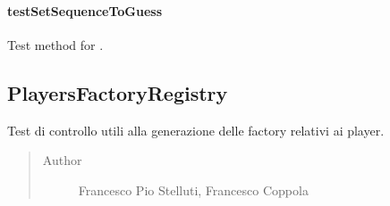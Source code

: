 \documentclass[letterpaper,10pt,italian,openany,oneside]{sphinxmanual}
\begin{document}
\paragraph{testSetSequenceToGuess}
\label{\detokenize{test/it/unicam/cs/pa/mastermind/test/GameCoreBoardModelTest:testsetsequencetoguess}}

\begin{fulllineitems}
\label{\detokenize{test/it/unicam/cs/pa/mastermind/test/GameCoreBoardModelTest:it.unicam.cs.pa.mastermind.test.GameCoreBoardModelTest.testSetSequenceToGuess()}}
Test method for .

\end{fulllineitems}



\subsection{PlayersFactoryRegistry}
\label{\detokenize{test/it/unicam/cs/pa/mastermind/test/PlayersFactoryRegistry:playersfactoryregistry}}\label{\detokenize{test/it/unicam/cs/pa/mastermind/test/PlayersFactoryRegistry::doc}}

\begin{fulllineitems}
\label{\detokenize{test/it/unicam/cs/pa/mastermind/test/PlayersFactoryRegistry:it.unicam.cs.pa.mastermind.test.PlayersFactoryRegistry}}
Test di controllo utili alla generazione delle factory relativi ai player.
\begin{quote}\begin{description}
\item[{Author}] \leavevmode
Francesco Pio Stelluti, Francesco Coppola

\end{description}\end{quote}

\end{fulllineitems}
\end{document}
